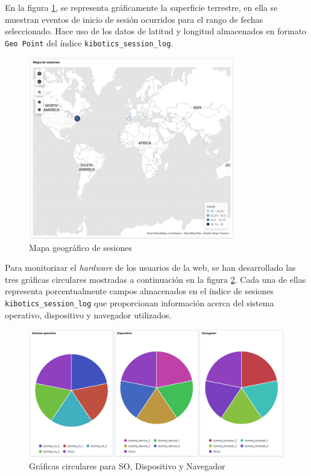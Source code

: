 \documentclass[11pt,a4paper]{book}
\begin{document}
				En la figura \ref{fig:kibana_map}, se representa gráficamente la superficie terrestre, en ella se muestran eventos de inicio de sesión ocurridos para el rango de fechas seleccionado. Hace uso de los datos de latitud y longitud almacenados en formato \texttt{Geo Point} del índice \texttt{kibotics\_session\_log}.
				\begin{figure}[H]
					\centering
					\includegraphics[width=9cm, keepaspectratio]{img/kibana_06_map}
					\caption{Mapa geográfico de sesiones}
					\label{fig:kibana_map}
				\end{figure}

				Para monitorizar el \textit{hardware} de los usuarios de la web, se han desarrollado las tres gráficas circulares mostradas a continuación en la figura \ref{fig:kibana_pie}. Cada una de ellas representa porcentualmente campos almacenados en el índice de sesiones  \texttt{kibotics\_session\_log} que proporcionan información acerca del sistema operativo, dispositivo y navegador utilizados.
				\begin{figure}[H]
					\centering
					\includegraphics[width=13cm, keepaspectratio]{img/kibana_07_pie}
					\caption{Gráficas circulares para SO, Dispositivo y Navegador}
					\label{fig:kibana_pie}
				\end{figure}
\end{document}
